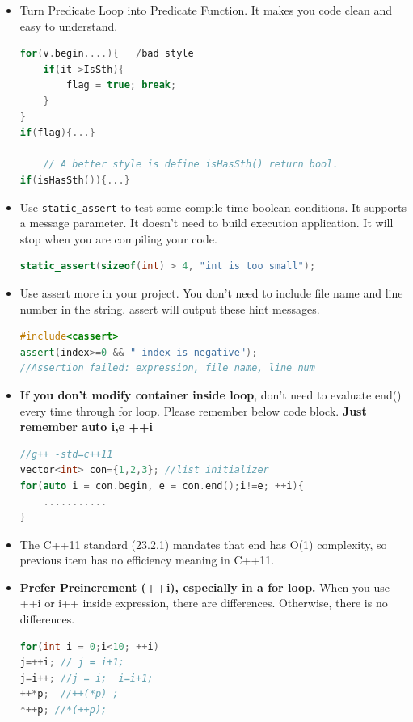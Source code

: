 \documentclass[a4paper,12pt,twoside]{book}
\begin{document}
\begin{itemize}
	\item Turn Predicate Loop into Predicate Function. It makes you code clean and easy to understand.
	
\begin{lstlisting}[frame=single, language=c++]
for(v.begin....){   /bad style
	if(it->IsSth){
		flag = true; break;
	}
}
if(flag){...}
	
	// A better style is define isHasSth() return bool.
if(isHasSth()){...}
\end{lstlisting}
	
	\item Use \texttt{static\_assert} to test some compile-time boolean conditions. It supports a message parameter. It doesn't need to build execution application. It will stop when you are compiling your code. 
\begin{lstlisting}[frame=single, language=c++]
static_assert(sizeof(int) > 4, "int is too small");
\end{lstlisting}
	
	\item Use assert more in your project. You don't need to include file name and line number in the string. assert will output these hint messages.
\begin{lstlisting}[frame=single, language=c++]
#include<cassert>
assert(index>=0 && " index is negative");
//Assertion failed: expression, file name, line num
\end{lstlisting}
	
	\item \textbf{If you don't modify container inside loop}, don't need to evaluate end() every time through for loop. Please remember below code block. \textbf{Just remember auto i,e ++i}
\begin{lstlisting}[frame=single, language=c++]
//g++ -std=c++11
vector<int> con={1,2,3}; //list initializer
for(auto i = con.begin, e = con.end();i!=e; ++i){
	...........
}
\end{lstlisting}
	
	\item The C++11 standard (23.2.1) mandates that end has O(1) complexity, so previous item has no efficiency meaning in C++11.
	
	
	\item \textbf{Prefer Preincrement (++i), especially in a for loop.}  When you use ++i or i++ inside expression, there are differences. Otherwise, there is no differences.
\begin{lstlisting}[frame=single, language=c++]
for(int i = 0;i<10; ++i)
j=++i; // j = i+1;
j=i++; //j = i;  i=i+1;
++*p;  //++(*p) ;
*++p; //*(++p);
\end{lstlisting}
	

\end{itemize}
\end{document}
